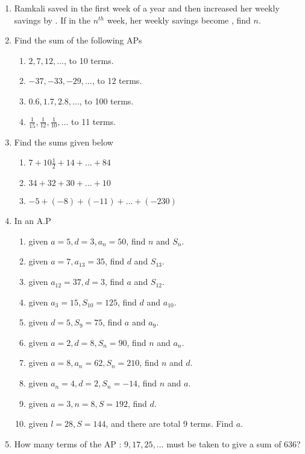 \begin{enumerate}[label=\thesubsection.\arabic*, ref=\thesubsection.\theenumi]
\item Ramkali saved  in the first week of a year and then increased her weekly savings by . If in the $n^{th}$ week,  her weekly savings become ,  find $n$.
\item Find the sum of the following APs
	\begin{multicols}{2}
\begin{enumerate}
	\item $2,  7,  12,  \dots $,  to 10 terms.
	\item $-37,  -33,  -29,  \dots $,  to 12 terms.
	\item $ 0.6,  1.7,  2.8,  \dots $,  to 100 terms.
	\item $\frac{1}{15},  \frac{1}{12},  \frac{1}{10}, \dots  $ to 11 terms.
\end{enumerate}
\end{multicols}
\item Find the sums given below 
\begin{enumerate}
\item $7+10\frac{1}{2}+14+\dots +84$
\item $34 + 32 + 30 + \dots + 10$
\item $-5 + (-8) + (-11) + \dots + (-230)$
\end{enumerate}
\item In an A.P
\begin{enumerate}
\item given $a = 5,  d = 3,  a_n = 50$,  find $n$ and $S_n$.
\item given $a = 7,  a_{13} = 35$,  find $d$ and $S_{13}$.
\item  given $a_{12} = 37,  d = 3$,  find $a$ and $S_{12}$.
\item given $a_3 = 15,  S_{10} = 125$,  find $d$ and $a_{10}$.
\item given $d = 5,  S_9= 75$,  find $a$ and $a_9$.
\item given $a = 2,  d = 8,  S_n = 90$,  find $n$ and $a_n$.
\item  given $a = 8,  a_n = 62,  S_n = 210$,  find $n$ and $d$.
\item given $a_n = 4,  d = 2,  S_n = -14$,  find $n$ and $a$.
\item given $a = 3,  n = 8,  S = 192$,  find $d$.
\item given $l = 28,  S = 144$,  and there are total 9 terms. Find $a$.
\end{enumerate}
\item How many terms of the AP : $9,  17,  25,  \dots $ must be taken to give a sum of 636?

\end{enumerate}
